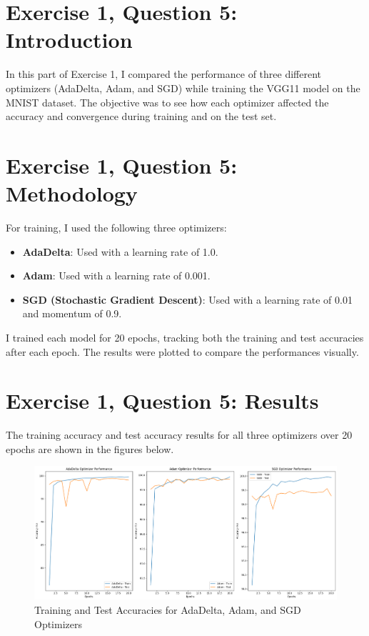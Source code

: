 \documentclass[10pt,letter,notitlepage]{article}
\begin{document}
\begin{center}
\section{Exercise 1, Question 5: Introduction}
In this part of Exercise 1, I compared the performance of three different optimizers (AdaDelta, Adam, and SGD) while training the VGG11 model on the MNIST dataset. The objective was to see how each optimizer affected the accuracy and convergence during training and on the test set.

\section{Exercise 1, Question 5: Methodology}
For training, I used the following three optimizers:
\begin{itemize}
    \item \textbf{AdaDelta}: Used with a learning rate of 1.0.
    \item \textbf{Adam}: Used with a learning rate of 0.001.
    \item \textbf{SGD (Stochastic Gradient Descent)}: Used with a learning rate of 0.01 and momentum of 0.9.
\end{itemize}

I trained each model for 20 epochs, tracking both the training and test accuracies after each epoch. The results were plotted to compare the performances visually.

\section{Exercise 1, Question 5: Results}
The training accuracy and test accuracy results for all three optimizers over 20 epochs are shown in the figures below.

\begin{figure}[H]
    \centering
    \includegraphics[width=1\textwidth]{1.5.1.png}
    \caption{Training and Test Accuracies for AdaDelta, Adam, and SGD Optimizers}
    \label{fig:optimizer_performance}
\end{figure}


\end{center}
\end{document}
